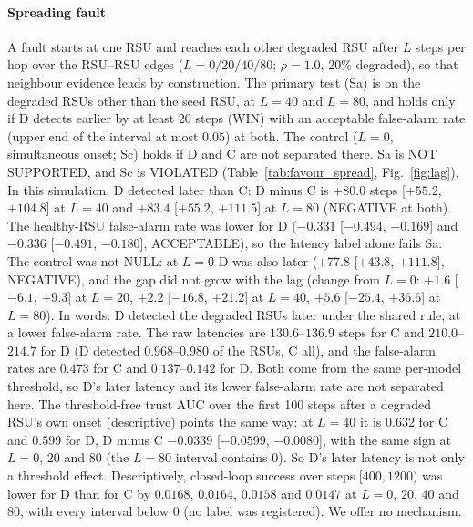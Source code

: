 \paragraph*{Spreading fault}
A fault starts at one RSU and reaches each other degraded RSU after $L$ steps per hop over the RSU--RSU edges ($L=0/20/40/80$; $\rho=1.0$, 20\% degraded), so that neighbour evidence leads by construction.
The primary test (Sa) is on the degraded RSUs other than the seed RSU, at $L=40$ and $L=80$, and holds only if D detects earlier by at least 20 steps (WIN) with an acceptable false-alarm rate (upper end of the interval at most $0.05$) at both.
The control ($L=0$, simultaneous onset; Sc) holds if D and C are not separated there.
Sa is NOT SUPPORTED, and Sc is VIOLATED (Table~\ref{tab:favour_spread}, Fig.~\ref{fig:lag}).
In this simulation, D detected later than C: D minus C is $+80.0$ steps [$+55.2$, $+104.8$] at $L=40$ and $+83.4$ [$+55.2$, $+111.5$] at $L=80$ (NEGATIVE at both).
The healthy-RSU false-alarm rate was lower for D ($-0.331$ [$-0.494$, $-0.169$] and $-0.336$ [$-0.491$, $-0.180$], ACCEPTABLE), so the latency label alone fails Sa.
The control was not NULL: at $L=0$ D was also later ($+77.8$ [$+43.8$, $+111.8$], NEGATIVE), and the gap did not grow with the lag (change from $L=0$: $+1.6$ [$-6.1$, $+9.3$] at $L=20$, $+2.2$ [$-16.8$, $+21.2$] at $L=40$, $+5.6$ [$-25.4$, $+36.6$] at $L=80$).
In words: D detected the degraded RSUs later under the shared rule, at a lower false-alarm rate.
The raw latencies are $130.6$--$136.9$ steps for C and $210.0$--$214.7$ for D (D detected $0.968$--$0.980$ of the RSUs, C all), and the false-alarm rates are $0.473$ for C and $0.137$--$0.142$ for D.
Both come from the same per-model threshold, so D's later latency and its lower false-alarm rate are not separated here.
The threshold-free trust AUC over the first 100 steps after a degraded RSU's own onset (descriptive) points the same way: at $L=40$ it is $0.632$ for C and $0.599$ for D, D minus C $-0.0339$ [$-0.0599$, $-0.0080$], with the same sign at $L=0$, $20$ and $80$ (the $L=80$ interval contains $0$).
So D's later latency is not only a threshold effect.
Descriptively, closed-loop success over steps $[400,1200)$ was lower for D than for C by $0.0168$, $0.0164$, $0.0158$ and $0.0147$ at $L=0$, $20$, $40$ and $80$, with every interval below $0$ (no label was registered).
We offer no mechanism.


